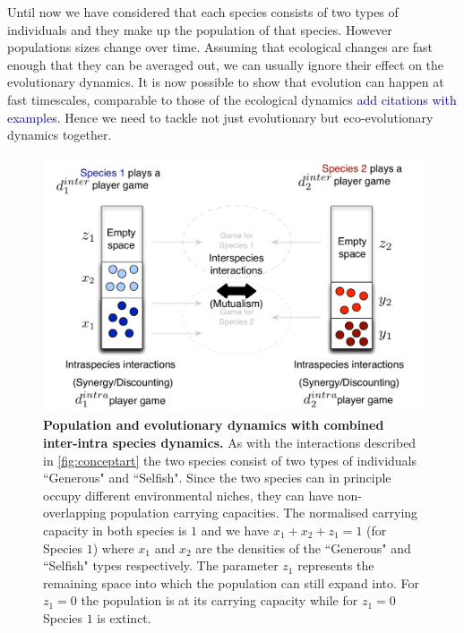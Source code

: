 \documentclass{pnastwo}
\newcommand{\cha}[1]{\textcolor{darkblue}{#1}}
\begin{document}
\begin{article}
Until now we have considered that each species consists of two types of individuals and they make up the population of that species.
However populations sizes change over time. 
Assuming that ecological changes are fast enough that they can be averaged out, we can usually ignore their effect on the evolutionary dynamics.
It is now possible to show that evolution can happen at fast timescales, comparable to those of the ecological dynamics \cha{add citations with examples}.
Hence we need to tackle not just evolutionary but eco-evolutionary dynamics together.
%
\begin{figure}
\begin{center}
\includegraphics[width=\columnwidth]{../Figures/popdyninterintra.pdf}
\caption{
\textbf{Population and evolutionary dynamics with combined inter-intra species dynamics.}
As with the interactions described in \ref{fig:conceptart} the two species consist of two types of individuals ``Generous" and ``Selfish".
Since the two species can in principle occupy different environmental niches, they  can have non-overlapping population carrying capacities.
The normalised carrying capacity in both species is $1$ and we have $x_1 + x_2 + z_1 = 1$ (for Species $1$) where $x_1$ and $x_2$ are the densities of the ``Generous" and ``Selfish" types respectively. 
The parameter $z_1$ represents the remaining space into which the population can still expand into.
For $z_1 = 0$ the population is at its carrying capacity while for $z_1 = 0$ Species $1$ is extinct. 
\label{fig:conceptartpopdyn}
}
\end{center}
\end{figure}
%


\end{article}
\end{document}
